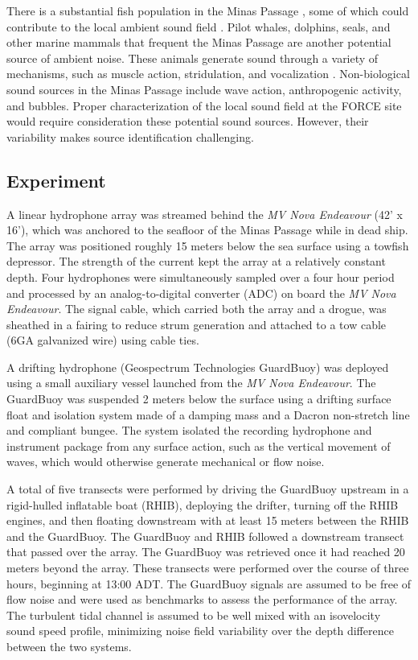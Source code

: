 \documentclass[12pt,journal,onecolumn]{IEEEtran}
\begin{document}
There is a substantial fish population in the Minas Passage \cite{dadswell}, some of which could contribute to the local ambient sound field \cite{wilson}. Pilot whales, dolphins, seals, and other marine mammals that frequent the Minas Passage are another potential source of ambient noise. These animals generate sound through a variety of mechanisms, such as muscle action, stridulation, and vocalization \cite{hilde}. Non-biological sound sources in the Minas Passage include wave action, anthropogenic activity, and bubbles. Proper characterization of the local sound field at the FORCE site would require consideration these potential sound sources. However, their variability makes source identification challenging. 



\subsection{Experiment}
A linear hydrophone array was streamed behind the \textit{MV Nova Endeavour} (42' x 16'), which was anchored to the seafloor of the Minas Passage while in dead ship. The array was positioned roughly 15 meters below the sea surface using a towfish depressor. The strength of the current kept the array at a relatively constant depth. Four hydrophones were simultaneously sampled over a four hour period and processed by an analog-to-digital converter (ADC) on board the \textit{MV Nova Endeavour}. The signal cable, which carried both the array and a drogue, was sheathed in a fairing to reduce strum generation and attached to a tow cable (6GA galvanized wire) using cable ties.

A drifting hydrophone (Geospectrum Technologies GuardBuoy) was deployed using a small auxiliary vessel launched from the \textit{MV Nova Endeavour}. The GuardBuoy was suspended 2 meters below the surface using a drifting surface float and isolation system made of a damping mass and a Dacron non-stretch line and compliant bungee.  The system isolated the recording hydrophone and instrument package from any surface action, such as the vertical movement of waves, which would otherwise generate mechanical or flow noise.

A total of five transects were performed by driving the GuardBuoy upstream in a rigid-hulled inflatable boat (RHIB), deploying the drifter, turning off the RHIB engines, and then floating downstream with at least 15 meters between the RHIB and the GuardBuoy. The GuardBuoy and RHIB followed a downstream transect that passed over the array. The GuardBuoy was retrieved once it had reached 20 meters beyond the array.
These transects were performed over the course of three hours, beginning at 13:00 ADT.
The GuardBuoy signals are assumed to be free of flow noise and were used as benchmarks to assess the performance of the array. The turbulent tidal channel is assumed to be well mixed with an isovelocity sound speed profile, minimizing noise field variability over the depth difference between the two systems.
\end{document}
